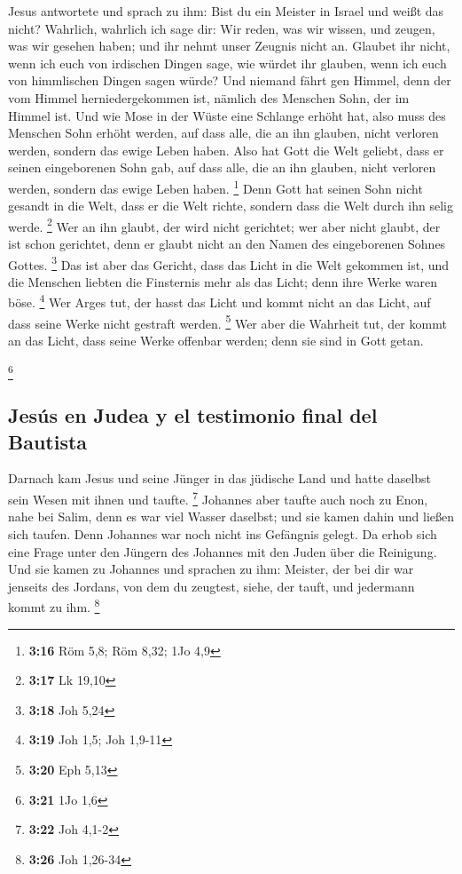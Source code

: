  Jesus antwortete und sprach zu ihm: Bist du ein Meister
in Israel und weißt das nicht?  Wahrlich, wahrlich ich
sage dir: Wir reden, was wir wissen, und zeugen, was wir gesehen haben;
und ihr nehmt unser Zeugnis nicht an.  Glaubet ihr nicht,
wenn ich euch von irdischen Dingen sage, wie würdet ihr glauben, wenn
ich euch von himmlischen Dingen sagen würde?  Und niemand
fährt gen Himmel, denn der vom Himmel herniedergekommen ist, nämlich des
Menschen Sohn, der im Himmel ist.  Und wie Mose in der
Wüste eine Schlange erhöht hat, also muss des Menschen Sohn erhöht
werden,  auf dass alle, die an ihn glauben, nicht
verloren werden, sondern das ewige Leben haben.  Also hat
Gott die Welt geliebt, dass er seinen eingeborenen Sohn gab, auf dass
alle, die an ihn glauben, nicht verloren werden, sondern das ewige Leben
haben. \footnote{\textbf{3:16} Röm 5,8; Röm 8,32; 1Jo 4,9}
 Denn Gott hat seinen Sohn nicht gesandt in die Welt,
dass er die Welt richte, sondern dass die Welt durch ihn selig werde.
\footnote{\textbf{3:17} Lk 19,10}  Wer an ihn glaubt, der
wird nicht gerichtet; wer aber nicht glaubt, der ist schon gerichtet,
denn er glaubt nicht an den Namen des eingeborenen Sohnes Gottes.
\footnote{\textbf{3:18} Joh 5,24}  Das ist aber das
Gericht, dass das Licht in die Welt gekommen ist, und die Menschen
liebten die Finsternis mehr als das Licht; denn ihre Werke waren böse.
\footnote{\textbf{3:19} Joh 1,5; Joh 1,9-11}  Wer Arges
tut, der hasst das Licht und kommt nicht an das Licht, auf dass seine
Werke nicht gestraft werden. \footnote{\textbf{3:20} Eph 5,13}
 Wer aber die Wahrheit tut, der kommt an das Licht, dass
seine Werke offenbar werden; denn sie sind in Gott getan.

\footnote{\textbf{3:21} 1Jo 1,6}

\hypertarget{jesuxfas-en-judea-y-el-testimonio-final-del-bautista}{%
\subsection{Jesús en Judea y el testimonio final del
Bautista}\label{jesuxfas-en-judea-y-el-testimonio-final-del-bautista}}

 Darnach kam Jesus und seine Jünger in das jüdische Land
und hatte daselbst sein Wesen mit ihnen und taufte. \footnote{\textbf{3:22}
  Joh 4,1-2}  Johannes aber taufte auch noch zu Enon,
nahe bei Salim, denn es war viel Wasser daselbst; und sie kamen dahin
und ließen sich taufen.  Denn Johannes war noch nicht ins
Gefängnis gelegt.  Da erhob sich eine Frage unter den
Jüngern des Johannes mit den Juden über die Reinigung. 
Und sie kamen zu Johannes und sprachen zu ihm: Meister, der bei dir war
jenseits des Jordans, von dem du zeugtest, siehe, der tauft, und
jedermann kommt zu ihm. \footnote{\textbf{3:26} Joh 1,26-34}

